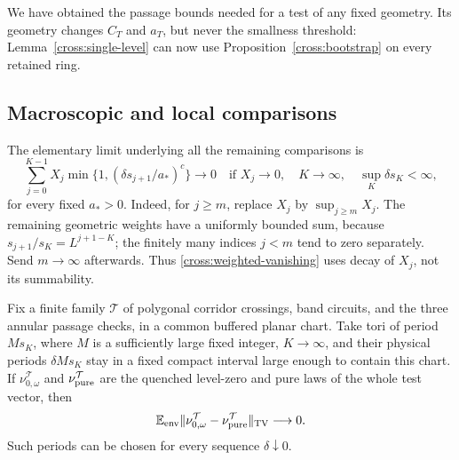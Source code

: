 We have obtained the passage bounds needed for a test of any fixed
geometry.  Its geometry changes $C_T$ and $a_T$, but never the smallness
threshold: Lemma~\ref{cross:single-level} can now use
Proposition~\ref{cross:bootstrap} on every retained ring.

\subsection{Macroscopic and local comparisons}

The elementary limit underlying all the remaining comparisons is
\begin{equation}
 \sum_{j=0}^{K-1}X_j\min\{1,(\delta s_{j+1}/a_*)^c\}\longrightarrow0
 \quad\text{if }X_j\to0,\quad K\to\infty,
 \quad\sup_K\delta s_K<\infty,
 \label{cross:weighted-vanishing}
\end{equation}
for every fixed $a_*>0$.  Indeed, for $j\geq m$, replace $X_j$ by
$\sup_{j\geq m}X_j$.  The remaining geometric weights have a uniformly
bounded sum, because $s_{j+1}/s_K=L^{j+1-K}$; the finitely many indices
$j<m$ tend to zero separately.  Send $m\to\infty$ afterwards.  Thus
\eqref{cross:weighted-vanishing} uses decay of $X_j$, not its summability.

\begin{proposition}
\label{cross:torus-comparison}
Fix a finite family $\mathcal T$ of polygonal corridor crossings, band
circuits, and the three annular passage checks, in a common buffered
planar chart.
Take tori of period $Ms_K$, where $M$ is a sufficiently large fixed
integer, $K\to\infty$, and their physical periods $\delta Ms_K$ stay in
a fixed compact interval large enough to contain this chart.  If
$\nu_{0,\omega}^{\mathcal T}$ and $\nu_{\rm pure}^{\mathcal T}$ are the
quenched level-zero and pure laws of the whole test vector, then
\begin{equation}
 \mathbb E_{\rm env}\|\nu_{0,\omega}^{\mathcal T}
                    -\nu_{\rm pure}^{\mathcal T}\|_{\operatorname{TV}}\longrightarrow0.
 \label{cross:torus-tv}
\end{equation}
Such periods can be chosen for every sequence $\delta\downarrow0$.
\end{proposition}

